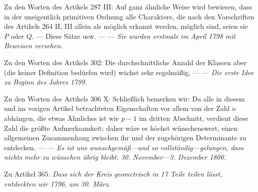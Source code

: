 Zu den Worten des Artikels 287 III: Auf ganz ähnliche Weise wird bewiesen, dass in der uneigentlich primitiven Ordnung alle Charaktere, die nach den Vorschriften des Artikels 264 II, III allein als möglich erkannt werden, möglich sind, seien sie \(P\) oder \(Q\). — Diese Sätze usw. — — \textit{Sie wurden erstmals im April 1798 mit Beweisen versehen.}


Zu den Worten des Artikels 302: Die durchschnittliche Anzahl der Klassen aber (die keiner Definition bedürfen wird) wächst sehr regelmäßig, — — \textit{Die erste Idee zu Beginn des Jahres 1799.}


Zu den Worten des Artikels 306 X: Schließlich bemerken wir: Da alle in diesem und im vorigen Artikel betrachteten Eigenschaften vor allem von der Zahl \(n\) abhängen, die etwas Ähnliches ist wie \(p-1\) im dritten Abschnitt, verdient diese Zahl die größte Aufmerksamkeit; daher wäre es höchst wünschenswert, einen allgemeinen Zusammenhang zwischen ihr und der zugehörigen Determinante zu entdecken. — — \textit{Es ist uns wunschgemäß—und so vollständig—gelungen, dass nichts mehr zu wünschen übrig bleibt. 30. November—3. Dezember 1800.}


Zu Artikel 365. \textit{Dass sich der Kreis geometrisch in 17 Teile teilen lässt, entdeckten wir 1796, am 30. März.}


\clearpage
